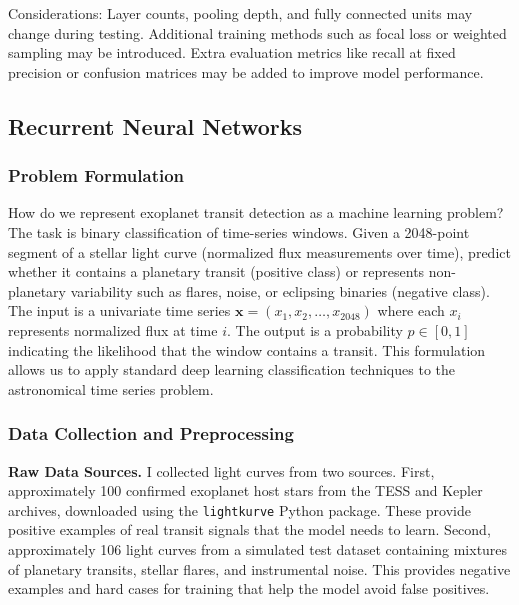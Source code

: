 \documentclass[letterpaper]{article} %
\begin{document}
Considerations: Layer counts, pooling depth, and fully connected units may change during testing. Additional training methods such as focal loss or weighted sampling may be introduced. Extra evaluation metrics like recall at fixed precision or confusion matrices may be added to improve model performance.

\subsection{Recurrent Neural Networks}

\subsubsection{Problem Formulation}

How do we represent exoplanet transit detection as a machine learning problem? The task is binary classification of time-series windows. Given a 2048-point segment of a stellar light curve (normalized flux measurements over time), predict whether it contains a planetary transit (positive class) or represents non-planetary variability such as flares, noise, or eclipsing binaries (negative class). The input is a univariate time series $\mathbf{x} = (x_1, x_2, \ldots, x_{2048})$ where each $x_i$ represents normalized flux at time $i$. The output is a probability $p \in [0,1]$ indicating the likelihood that the window contains a transit. This formulation allows us to apply standard deep learning classification techniques to the astronomical time series problem.

\subsubsection{Data Collection and Preprocessing}

\textbf{Raw Data Sources.} I collected light curves from two sources. First, approximately 100 confirmed exoplanet host stars from the TESS and Kepler archives, downloaded using the \texttt{lightkurve} Python package. These provide positive examples of real transit signals that the model needs to learn. Second, approximately 106 light curves from a simulated test dataset containing mixtures of planetary transits, stellar flares, and instrumental noise. This provides negative examples and hard cases for training that help the model avoid false positives.
\end{document}
